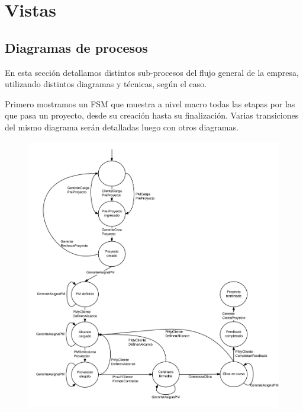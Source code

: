 \section{Vistas}




	\subsection{Diagramas de procesos}

En esta sección detallamos distintos sub-procesos del flujo general de la empresa, 
utilizando distintos diagramas y técnicas, según el caso. 

Primero mostramos un FSM que muestra a nivel macro todas las etapas por las 
que pasa un proyecto, desde su creación hasta su finalización. Varias transiciones 
del mismo diagrama serán detalladas luego con otros diagramas. 

\begin{figure}[H]
\includegraphics[width=\linewidth]{diag/nuevos/fsm-proj.png}
\label{fsm-proj}
\end{figure}


